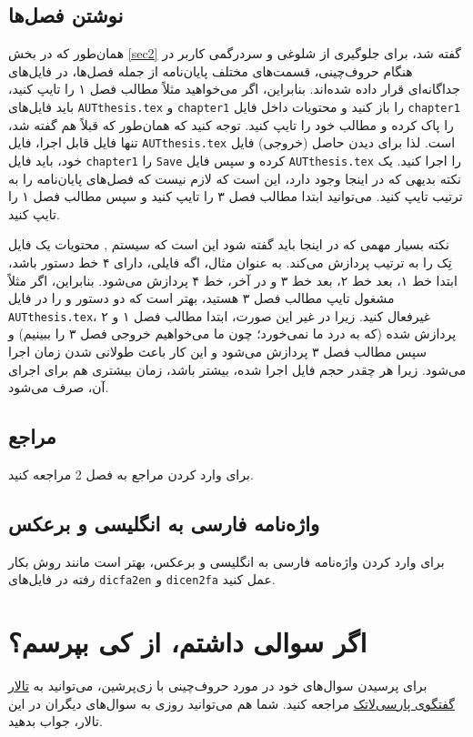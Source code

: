\subsection{نوشتن فصل‌ها}
همان‌طور که در بخش 
\ref{sec2}
گفته شد، برای جلوگیری از شلوغی و سردرگمی کاربر در هنگام حروف‌چینی، قسمت‌های مختلف پایان‌نامه از جمله فصل‌ها، در فایل‌های جداگانه‌ای قرار داده شده‌اند. 
بنابراین، اگر می‌خواهید مثلاً مطالب فصل ۱ را تایپ کنید، باید فایل‌های 
\verb;AUTthesis.tex;
و
\verb;chapter1;
را باز کنید و محتویات داخل فایل 
\verb;chapter1;
را پاک کرده و مطالب خود را تایپ کنید. توجه کنید که همان‌طور که قبلاً هم گفته شد، تنها فایل قابل اجرا، فایل 
\verb;AUTthesis.tex;
است. لذا برای دیدن حاصل (خروجی) فایل خود، باید فایل  
\verb;chapter1;
را 
\verb;Save;
کرده و سپس فایل 
\verb;AUTthesis.tex;
را اجرا کنید. یک نکته بدیهی که در اینجا وجود دارد، این است که لازم نیست که فصل‌های پایان‌نامه را به ترتیب تایپ کنید. می‌توانید ابتدا مطالب فصل ۳ را تایپ کنید و سپس مطالب فصل ۱ را تایپ کنید.

نکته بسیار مهمی که در اینجا باید گفته شود این است که سیستم
\lr{\TeX},
محتویات یک فایل تِک را به ترتیب پردازش می‌کند. به عنوان مثال، اگه فایلی، دارای ۴ خط دستور باشد، ابتدا خط ۱، بعد خط ۲، بعد خط ۳ و در آخر، خط ۴ پردازش می‌شود. بنابراین، اگر مثلاً مشغول تایپ مطالب فصل ۳ هستید، بهتر است
که دو دستور
\verb~~
و
\verb~~
را در فایل 
\verb~AUTthesis.tex~،
غیرفعال%
 کنید. زیرا در غیر این صورت، ابتدا مطالب فصل ۱ و ۲ پردازش شده (که به درد ما نمی‌خورد؛ چون ما می‌خواهیم خروجی فصل ۳ را ببینیم) و سپس مطالب فصل ۳ پردازش می‌شود و این کار باعث طولانی شدن زمان اجرا می‌شود. زیرا هر چقدر حجم فایل اجرا شده، بیشتر باشد، زمان بیشتری هم برای اجرای آن، صرف می‌شود.

\subsection{مراجع}
برای وارد کردن مراجع به فصل 2
مراجعه کنید.
\subsection{واژه‌نامه فارسی به انگلیسی و برعکس}
برای وارد کردن واژه‌نامه فارسی به انگلیسی و برعکس، بهتر است مانند روش بکار رفته در فایل‌های 
\verb;dicfa2en;
و
\verb;dicen2fa;
عمل کنید.

\section{اگر سوالی داشتم، از کی بپرسم؟}
برای پرسیدن سوال‌های خود در مورد حروف‌چینی با زی‌پرشین،  می‌توانید به
 \href{http://forum.parsilatex.com}{تالار گفتگوی پارسی‌لاتک}%
مراجعه کنید. شما هم می‌توانید روزی به سوال‌های دیگران در این تالار، جواب بدهید.
